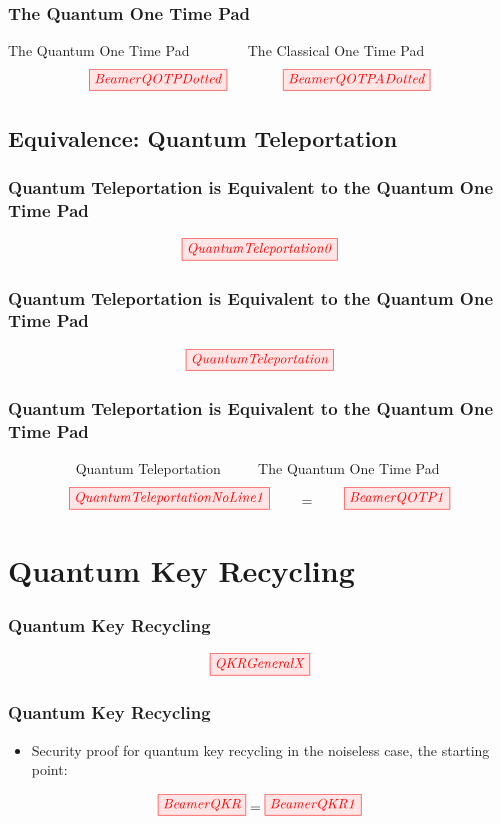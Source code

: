 \documentclass[]{beamer}
\begin{document}
\begin{frame}
	\frametitle{The Quantum One Time Pad}
	The Quantum One Time Pad ~~~~~~~ The Classical One Time Pad
	\begin{equation}
	\tikzfig{BeamerQOTPDotted} ~~~~~~~~~~~~ \tikzfig{BeamerQOTPADotted}
	\end{equation}
\end{frame}

\subsection{Equivalence: Quantum Teleportation}

\begin{frame}
	\frametitle{Quantum Teleportation is Equivalent to the Quantum One Time Pad}
	\begin{equation}
	\tikzfig{QuantumTeleportation0}
	\end{equation}
\end{frame}

\begin{frame}
	\frametitle{Quantum Teleportation is Equivalent to the Quantum One Time Pad}
	\begin{equation}
	\tikzfig{QuantumTeleportation}
	\end{equation}
\end{frame}

\begin{frame}
	\frametitle{Quantum Teleportation is Equivalent to the Quantum One Time Pad}
~~~~~~~~~	Quantum Teleportation ~~~~ The Quantum One Time Pad
	\begin{equation}
	\tikzfig{QuantumTeleportationNoLine1} ~~~~~~=~~~~~~ \tikzfig{BeamerQOTP1} %
	\end{equation}
\end{frame}
\begin{frame}
	\centering 
	\Huge
\end{frame}
\section{Quantum Key Recycling}
\begin{frame}
	\frametitle{Quantum Key Recycling}
	\begin{equation}
	\tikzfig{QKRGeneralX}
	\end{equation}
\end{frame}

\begin{frame}
	\frametitle{Quantum Key Recycling}
	\begin{itemize}
		\item Security proof for quantum key recycling in the noiseless case, the starting point:
		\vspace{0.5cm}
	\end{itemize}
	\begin{equation}
		\tikzfig{BeamerQKR} = \tikzfig{BeamerQKR1} 
	\end{equation}
\end{frame}
\end{document}
